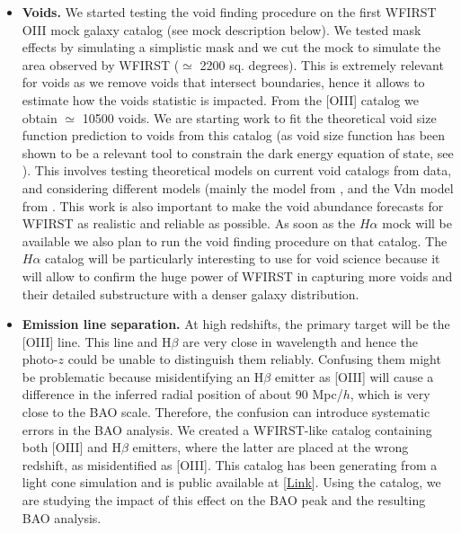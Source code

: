 \begin{itemize}

\item {\bf Voids.} We started testing the void finding procedure on the first
WFIRST OIII mock galaxy catalog (see mock description below). We tested mask
effects by simulating a simplistic mask and we cut the mock to simulate the area
observed by WFIRST ($\simeq$ 2200 sq. degrees). This is extremely relevant for
voids as we remove voids that intersect boundaries, hence it allows to estimate
how the voids statistic is impacted. From the [OIII] catalog we obtain $\simeq$
10500 voids. We are starting work to fit the theoretical void size function
prediction to voids from this catalog (as void size function has been shown to
be a relevant tool to constrain the dark energy equation of state, see
\cite{Pisani2015}). This involves testing theoretical models on current void
catalogs from data, and considering different models (mainly the model from
\cite{Sheth2004}, and the Vdn model from  \cite{Jennings2013}. This work is also
important to make the void abundance forecasts for WFIRST as realistic and
reliable as possible. As soon as the $H\alpha$ mock will be available we also
plan to run the void finding procedure on that catalog. The $H\alpha$ catalog
will be particularly interesting to use for void science because it will allow
to confirm the huge power of WFIRST in capturing more voids and their detailed
substructure with a denser galaxy distribution.

\item {\bf Emission line separation.} At high redshifts, the primary target will
be the [OIII] line. This line and H$\beta$ are very close in wavelength and
hence the photo-$z$ could be unable to distinguish them reliably. Confusing them
might be problematic because misidentifying an H$\beta$ emitter as [OIII] will
cause a difference in the inferred radial position of about $90$ Mpc/$h$, which
is very close to the BAO scale. Therefore, the confusion can introduce
systematic errors in the BAO analysis. We created a WFIRST-like catalog
containing both [OIII] and H$\beta$ emitters, where the latter are placed at the
wrong redshift, as misidentified as [OIII]. This catalog has been generating
from a light cone simulation and is public available at
[\href{http://www.wfirst-hls-cosmology.org/products/}{Link}]. Using the catalog,
we are studying the impact of this effect on the BAO peak and the resulting BAO
analysis.


\end{itemize}
